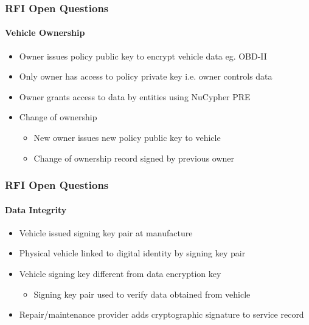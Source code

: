 \documentclass[xetex,mathsans,sans,aspectratio=169]{beamer}
\begin{document}
    \begin{frame}
      \frametitle{RFI Open Questions}
      \framesubtitle{Vehicle Ownership}
      \begin{itemize}
        \setlength\itemsep{1em}
        \item Owner issues policy public key to encrypt vehicle data eg. OBD-II
        \item Only owner has access to policy private key i.e. owner controls data
        \item Owner grants access to data by entities using NuCypher PRE
        \item Change of ownership
          \begin{itemize}
            \item New owner issues new policy public key to vehicle
            \item Change of ownership record signed by previous owner
          \end{itemize}
      \end{itemize}
    \end{frame}

    \begin{frame}
      \frametitle{RFI Open Questions}
      \framesubtitle{Data Integrity}
      \begin{itemize}
        \setlength\itemsep{1em}
        \item Vehicle issued signing key pair at manufacture
        \item Physical vehicle linked to digital identity by signing key pair
        \item Vehicle signing key different from data encryption key
        \begin{itemize}
          \item Signing key pair used to verify data obtained from vehicle
        \end{itemize}
        \item Repair/maintenance provider adds cryptographic signature to service record
      \end{itemize}
    \end{frame}
\end{document}
